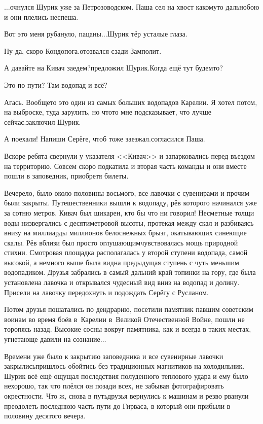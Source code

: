\vspace{0.5cm}

$\ldots$очнулся Шурик уже за Петрозоводском. Паша сел на хвост какому\sdash то дальнобою и они плелись неспеша. 

\diagdash Вот это меня рубануло, пацаны$\ldots$\mdash Шурик тёр усталые глаза.

\diagdash Ну да, скоро Кондопога.\mdash отозвался сзади Замполит.

\diagdash А давайте на Кивач заедем?\mdash предложил Шурик.\mdash Когда ещё тут будем\sdash то?

\diagdash Это по пути? Там водопад и всё?

\diagdash Агась. Вообще\sdash то это один из самых больших водопадов Карелии. Я хотел потом, на выброске, туда зарулить, но что\sdash то мне подсказывает, что лучше сейчас.\mdash заключил Шурик.

\diagdash А поехали! Напиши Серёге, чтоб тоже заезжал.\mdash согласился Паша.

Вскоре ребята свернули у указателя <<Кивач>> и запарковались перед въездом на территорию. Совсем скоро подкатила и вторая часть команды и они вместе пошли в заповедник, приобретя билеты.

Вечерело, было около половины восьмого, все лавочки с сувенирами и прочим были закрыты. Путешественники вышли к водопаду, рёв которого начинался уже за сотню метров. Кивач был шикарен, кто бы что ни говорил! Несметные толщи воды низвергались с десятиметровой высоты, протекая между скал и разбиваясь внизу на миллиарды миллионов белоснежных брызг, окатывающих синеющие скалы. Рёв вблизи был просто оглушающим\mdash чувствовалась мощь природной стихии. Смотровая площадка располагалась у второй ступени водопада, самой высокой, а немного выше была видна предыдущая ступень с чуть меньшим водопадиком. Друзья забрались в самый дальний край топинки на гору, где была установлена лавочка и открывался чудесный вид вниз на водопад и долину. Присели на лавочку передохнуть и подождать Серёгу с Русланом. 

Потом друзья пошатались по дендрарию, посетили памятник павшим советским воинам во время боёв в~Карелии в~Великой Отечественной Войне, пошли не торопясь назад. Высокие сосны вокруг памятника, как и всегда в таких местах, угнетающе давили на сознание$\ldots$ 

Времени уже было к закрытию заповедника и все сувенирные лавочки закрылись\mdash пришлось обойтись без традиционных магнитиков на холодильник. Шурик всё ещё ощущал последствия полуденного теплового удара и ему было нехорошо, так что плёлся он позади всех, не забывая фотографировать окрестности. Что ж, снова в путь\mdash друзья вернулись к машинам и резво рванули преодолеть последнюю часть пути до Гирваса, в который они прибыли в половину десятого вечера.

